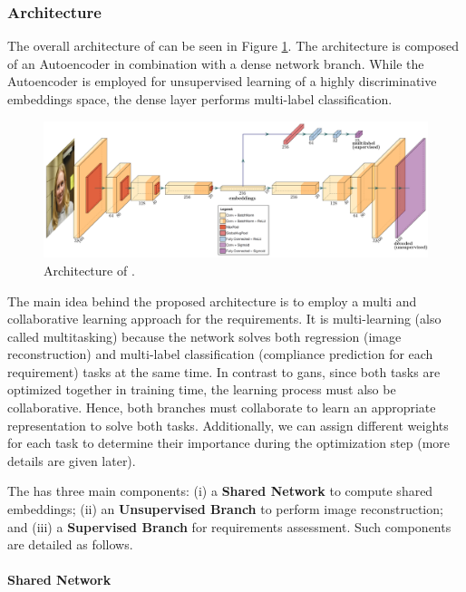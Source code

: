 \subsubsection{Architecture}

The overall architecture of \methodname can be seen in Figure \ref{fig:icaonet}. The architecture is composed of an Autoencoder in combination with a dense network branch. While the Autoencoder is employed for unsupervised learning of a highly discriminative embeddings space, the dense layer performs multi-label classification. 

\begin{figure}
    \centering
    \includegraphics[width=\linewidth]{images/icaonet.pdf}
    \caption{Architecture of \methodname.}
    \label{fig:icaonet}
\end{figure}

The main idea behind the proposed architecture is to employ a multi and collaborative learning approach for the \icao requirements. It is multi-learning (also called multitasking) because the network solves both regression (image reconstruction) and multi-label classification (compliance prediction for each requirement) tasks at the same time. In contrast to \acfp{gan}, since both tasks are optimized together in training time, the learning process must also be collaborative. Hence, both branches must collaborate to learn an appropriate representation to solve both tasks. Additionally, we can assign different weights for each task to determine their importance during the optimization step (more details are given later).

The \methodname has three main components: (i) a \textbf{Shared Network} to compute shared embeddings; (ii) an \textbf{Unsupervised Branch} to perform image reconstruction; and (iii) a \textbf{Supervised Branch} for requirements assessment. Such components are detailed as follows.

\paragraph{Shared Network}

